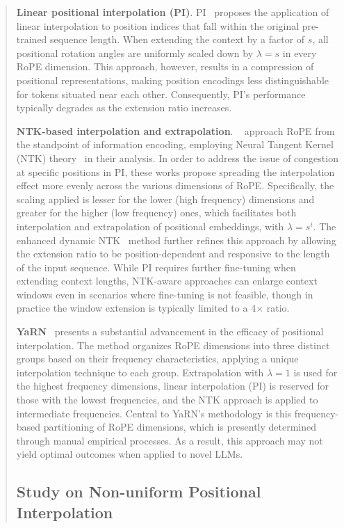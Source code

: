 \begin{abstract}
\textbf{Linear positional interpolation (PI)}. PI~\cite{pi} proposes the application of linear interpolation to position indices that fall within the original pre-trained sequence length. When extending the context by a factor of $s$, all positional rotation angles are uniformly scaled down by $\lambda = s$ in every RoPE dimension. This approach, however, results in a compression of positional representations, making position encodings less distinguishable for tokens situated near each other. Consequently, PI's performance typically degrades as the extension ratio increases.

\textbf{NTK-based interpolation and extrapolation}. ~\cite{ntk,dynamicntk} approach RoPE from the standpoint of information encoding, employing Neural Tangent Kernel (NTK) theory~\cite{jacot2018neural,tancik2020fourier} in their analysis. In order to address the issue of congestion at specific positions in PI, these works propose spreading the interpolation effect more evenly across the various dimensions of RoPE. Specifically, the scaling applied is lesser for the lower (high frequency) dimensions and greater for the higher (low frequency) ones, which facilitates both interpolation and extrapolation of positional embeddings, with $\lambda=s^{i}$. The enhanced dynamic NTK~\cite{dynamicntk} method further refines this approach by allowing the extension ratio to be position-dependent and responsive to the length of the input sequence. While PI requires further fine-tuning when extending context lengths, NTK-aware approaches can enlarge context windows even in scenarios where fine-tuning is not feasible, though in practice the window extension is typically limited to a 4$\times$ ratio.

\textbf{YaRN}~\cite{yarn} presents a substantial advancement in the efficacy of positional interpolation. The method organizes RoPE dimensions into three distinct groups based on their frequency characteristics, applying a unique interpolation technique to each group. Extrapolation with $\lambda=1$ is used for the highest frequency dimensions, linear interpolation (PI) is reserved for those with the lowest frequencies, and the NTK approach is applied to intermediate frequencies. Central to YaRN's methodology is this frequency-based partitioning of RoPE dimensions, which is presently determined through manual empirical processes. As a result, this approach may not yield optimal outcomes when applied to novel LLMs.

\subsection{Study on Non-uniform Positional Interpolation}


\end{abstract}
